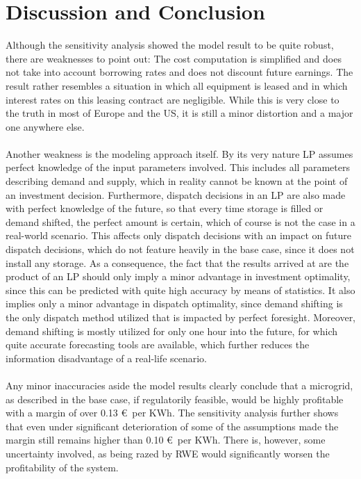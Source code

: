 \documentclass[
	11pt,								%
	DIV10,								%
	a4paper,         					%
	oneside,							%
	headheight=20pt,					%
	footheight=20pt,					%
    parskip=full,						%
    listof=totoc,						%
	bibliography=totoc,					%
	index=totoc,						%
]{scrartcl}
\begin{document}
 
\newpage
{}	
\section{Discussion and Conclusion}
Although the sensitivity analysis showed the model result to be quite robust, there are weaknesses to point out: The cost computation is simplified and does not take into account borrowing rates and does not discount future earnings. The result rather resembles a situation in which all equipment is leased and in which interest rates on this leasing contract are negligible. While this is very close to the truth in most of Europe and the US, it is still a minor distortion and a major one anywhere else.\\\\
Another weakness is the modeling approach itself. By its very nature LP assumes perfect knowledge of the input parameters involved. This includes all parameters describing demand and supply, which in reality cannot be known at the point of an investment decision. Furthermore, dispatch decisions in an LP are also made with perfect knowledge of the future, so that every time storage is filled or demand shifted, the perfect amount is certain, which of course is not the case in a real-world scenario. This affects only dispatch decisions with an impact on future dispatch decisions, which do not feature heavily in the base case, since it does not install any storage. As a consequence, the fact that the results arrived at are the product of an LP should only imply a minor advantage in investment optimality, since this can be predicted with quite high accuracy by means of statistics. It also implies only a minor advantage in dispatch optimality, since demand shifting is the only dispatch method utilized that is impacted by perfect foresight. Moreover, demand shifting is mostly utilized for only one hour into the future, for which quite accurate forecasting tools are available, which further reduces the information disadvantage of a real-life scenario.\\\\
Any minor inaccuracies aside the model results clearly conclude that a microgrid, as described in the base case, if regulatorily feasible, would be highly profitable with a margin of over 0.13 \euro\ per KWh. The sensitivity analysis further shows that even under significant deterioration of some of the assumptions made the margin still remains higher than 0.10 \euro\ per KWh. There is, however, some uncertainty involved, as being razed by RWE would significantly worsen the profitability of the system. \\
\end{document}
